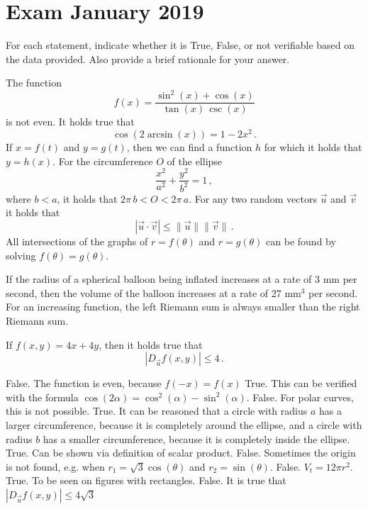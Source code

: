 \section{Exam January 2019}
\begin{Exercise} For each statement, indicate whether it is True, False, or not verifiable based on the data provided. Also provide a brief rationale for your answer. 

\Question The function 
$$
f(x)=\dfrac{\sin^2(x)+\cos(x)}{\tan(x)\,\csc(x)}
$$
is not even.
\Question It holds true that
$$
\cos\left(2\arcsin(x)\right)=1-2x^2\,.
$$
\Question If $x=f(t)$ and $y=g(t)$, then we can find a function $h$ for which it holds that $y=h(x)$.
\Question For the circumference $O$ of the ellipse 
$$
\dfrac{x^2}{a^2}+\dfrac{y^2}{b^2}=1\,,
$$
where $b<a$, it holds that $2\pi\,b<O<2\pi\,a$.
\Question For any two random vectors $\vec{u}$ and $\vec{v}$ it holds that
$$
|\vec{u}\cdot\vec{v}|\leq\|\vec{u}\|\|\vec{v}\|\,.
$$
\Question All intersections of the graphs of $r=f(\theta)$ and $r=g(\theta)$ can be found by solving $f(\theta)=g(\theta)$.

\Question If the radius of a spherical balloon being inflated increases at a rate of 3 mm per second, then the volume of the balloon increases at a rate of 27 mm$^3$ per second.
\Question For an increasing function, the left Riemann sum is always smaller than the right Riemann sum.


\Question If $f(x,y)=4x+4y$, then it holds true that
$$
\left|D_{\vec{u}}f(x,y)\right|\leq4\,.
$$
\end{Exercise}


\begin{Answer}\phantom{}

\Question False. The function is even, because $f(-x)=f(x)$
\Question True. This can be verified with the formula $\cos(2\alpha)=\cos^2(\alpha)-\sin^2(\alpha)$.
\Question False. For polar curves, this is not possible.
\Question True. It can be reasoned that a circle with radius $a$ has a larger circumference, because it is completely around the ellipse, and a circle with radius $b$ has a smaller circumference, because it is completely inside the ellipse.
\Question True. Can be shown via definition of scalar product.
\Question False. Sometimes the origin is not found, e.g. when $r_1=\sqrt{3}\cos(\theta)$ and $r_2=\sin(\theta)$.
\Question False. $V_t=12\pi r^2$.
\Question True. To be seen on figures with rectangles.
\Question False. It is true that $\left|D_{\vec{u}}f(x,y)\right|\leq 4\sqrt{3}$
  
\end{Answer}




